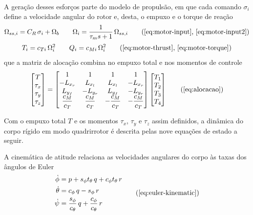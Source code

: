 A geração desses esforços parte do modelo de propulsão, em que cada comando $\sigma_i$ define a velocidade angular do rotor e, desta, o empuxo e o torque de reação
\begin{equation*}
  \Omega_{ss,i} = C_R\,\sigma_i + \Omega_b
  \qquad
  \Omega_i = \frac{1}{\tau_m s + 1}\,\Omega_{ss,i}
  \tag{\ref{eq:motor-input}, \ref{eq:motor-input2}}
\end{equation*}
\begin{equation*}
  T_i = c_{Ti}\,\Omega_i^{2}
  \qquad
  Q_i = c_{Mi}\,\Omega_i^{2}
  \tag{\ref{eq:motor-thrust}, \ref{eq:motor-torque}}
\end{equation*}
que a matriz de alocação combina no empuxo total e nos momentos de controle
\begin{equation*}
    \begin{bmatrix} T \\ \tau_x \\ \tau_y \\ \tau_z \end{bmatrix} =
    \begin{bmatrix}
        1 & 1 & 1 & 1 \\
        -L_{x_r} & L_{x_l} & L_{x_l} & -L_{x_r} \\
        L_{y_f} & -L_{y_r} & L_{y_f} & -L_{y_r} \\
        \dfrac{c_M}{c_T} & \dfrac{c_M}{c_T} & -\dfrac{c_M}{c_T} & -\dfrac{c_M}{c_T}
    \end{bmatrix}
    \begin{bmatrix} T_1 \\ T_2 \\ T_3 \\ T_4 \end{bmatrix}
    \tag{\ref{eq:alocacao}}
\end{equation*}

Com o empuxo total $T$ e os momentos $\tau_x$, $\tau_y$ e $\tau_z$ assim definidos, a dinâmica do corpo rígido em modo quadrirrotor é descrita pelas nove equações de estado a seguir.

A cinemática de atitude relaciona as velocidades angulares do corpo às taxas dos ângulos de Euler
\begin{equation*}
\begin{aligned}
  \dot{\phi} &= p + s_\phi t_\theta\,q + c_\phi t_\theta\,r \\
  \dot{\theta} &= c_\phi\,q - s_\phi\,r \\
  \dot{\psi} &= \frac{s_\phi}{c_\theta}\,q + \frac{c_\phi}{c_\theta}\,r
\end{aligned}
\tag{\ref{eq:euler-kinematic}}
\end{equation*}

